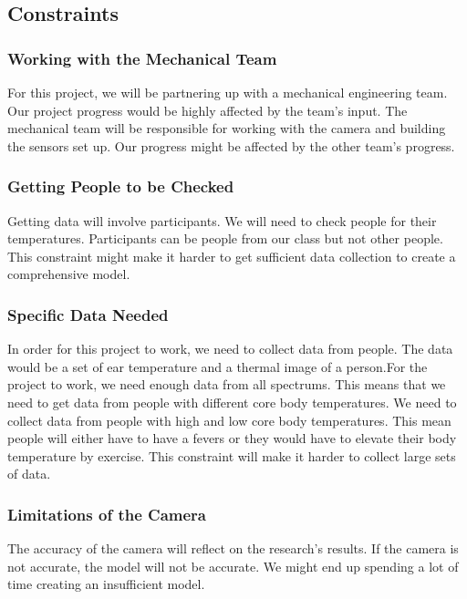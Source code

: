 \documentclass[onecolumn, draftclsnofoot,10pt, compsoc]{IEEEtran}
\begin{document}
	\subsection{Constraints}
		\subsubsection{Working with the Mechanical Team}
		For this project, we will be partnering up with a mechanical engineering team. Our project progress would be highly affected by the team’s input. The mechanical team will be responsible for working with the camera and building the sensors set up. Our progress might be affected by the other team’s progress.
		\subsubsection{Getting People to be Checked}
		Getting data will involve participants. We will need to check people for their temperatures. Participants can be people from our class but not other people. This constraint might make it harder to get sufficient data collection to create a comprehensive model.
		\subsubsection{Specific Data Needed}
		In order for this project to work, we need to collect data from people. The data would be a set of ear temperature and a thermal image of a person.For the project to work, we need enough data from all spectrums. This means that we need to get data from people with different core body temperatures. We need to collect data from people with high and low core body temperatures. This mean people will either have to have a fevers or they would have to elevate their body temperature by exercise. This constraint will make it harder to collect large sets of data.
		\subsubsection{Limitations of the Camera}
		The accuracy of the camera will reflect on the research’s results. If the camera is not accurate, the model will not be accurate. We might end up spending a lot of time creating an insufficient model.
\end{document}
